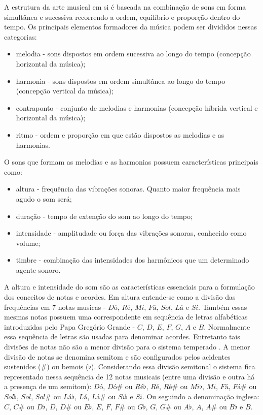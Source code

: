 A estrutura da arte musical em si é baseada na combinação de sons em forma simultânea e sucessiva recorrendo a ordem, equilíbrio e proporção dentro do tempo. Os principais elementos formadores da música podem ser divididos nessas categorias:
\begin{itemize}
	\item melodia - sons dispostos em ordem sucessiva ao longo do tempo (concepção horizontal da música);
	\item harmonia - sons dispostos em ordem simultânea ao longo do tempo (concepção vertical da música);
	\item contraponto - conjunto de melodias e harmonias (concepção híbrida vertical e horizontal da música);
	\item ritmo - ordem e proporção em que estão dispostos as melodias e as harmonias.
\end{itemize}

O sons que formam as melodias e as harmonias possuem características principais como:
\begin{itemize}
	\item altura - frequência das vibrações sonoras. Quanto maior frequência mais agudo o som será;
	\item duração - tempo de extenção do som ao longo do tempo;
	\item intensidade - amplitudade ou força das vibrações sonoras, conhecido como volume;
	\item timbre - combinação das intensidades dos harmônicos que um determinado agente sonoro.
\end{itemize}

A altura e intensidade do som são as características essenciais para a formulação dos conceitos de notas e acordes. Em altura entende-se como a divisão das frequências em 7 notas musicas - $Dó$, $Ré$, $Mi$, $Fá$, $Sol$, $Lá$ e $Si$. Também essas mesmas notas possuem uma correspondente em sequência de letras alfabéticas introduzidas pelo Papa Gregório Grande - $C$, $D$, $E$, $F$, $G$, $A$ e $B$. Normalmente essa sequência de letras são usadas para denominar acordes. Entretanto tais divisões de notas não são a menor divisão para o sistema temperado \cite{med1996teoria}. A menor divisão de notas se denomina semitom e são configurados pelos acidentes sustenidos ($\#$) ou bemois ($\flat$). Considerando essa divisão semitonal o sistema fica representado nessa sequência de 12 notas musicais (entre uma divisão e outra há a presença de um semitom): $Dó$, $Dó\#$ ou $Ré\flat$, $Ré$, $Ré\#$ ou $Mi\flat$, $Mi$, $Fá$, $Fá\#$ ou $Sol\flat$, $Sol$, $Sol\#$ ou $Lá\flat$, $Lá$, $Lá\#$ ou $Si\flat$ e $Si$. Ou seguindo a denominação inglesa: $C$, $C\#$ ou $D\flat$, $D$, $D\#$ ou $E\flat$, $E$, $F$, $F\#$ ou $G\flat$, $G$, $G\#$ ou $A\flat$, $A$, $A\#$ ou $B\flat$ e $B$.

